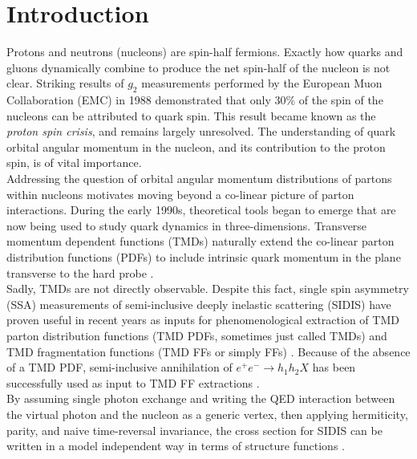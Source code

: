\chapter{Introduction}

Protons and neutrons (nucleons) are spin-half fermions.  Exactly how quarks and gluons dynamically combine to produce the net spin-half of the nucleon is not clear.  Striking results of $g_2$ measurements performed by the European Muon Collaboration (EMC) in 1988 \cite{pdfs-leader:1988} demonstrated that only $30\%$ of the spin of the nucleons can be attributed to quark spin.  This result became known as the \textit{proton spin crisis}, and remains largely unresolved.  The understanding of quark orbital angular momentum in the nucleon, and its contribution to the proton spin, is of vital importance.  \\

Addressing the question of orbital angular momentum distributions of partons within nucleons motivates moving beyond a co-linear picture of parton interactions.   During the early 1990s, theoretical tools began to emerge that are now being used to study quark dynamics in three-dimensions.  Transverse momentum dependent functions (TMDs) naturally extend the co-linear parton distribution functions (PDFs) to include intrinsic quark momentum in the plane transverse to the hard probe \cite{tmds-mulders:1995, tmds-bacchetta:2006}.  \\

Sadly, TMDs are not directly observable.  Despite this fact, single spin asymmetry (SSA) measurements of semi-inclusive deeply inelastic scattering (SIDIS) have proven useful in recent years as inputs for phenomenological extraction of TMD parton distribution functions (TMD PDFs, sometimes just called TMDs) and TMD fragmentation functions (TMD FFs or simply FFs) \cite{tmds-airapetian:2009, tmds-airapetian:2012, tmds-aghasyan:2017}.  Because of the absence of a TMD PDF, semi-inclusive annihilation of $e^+ e^- \rightarrow h_1 h_2 X$ has been successfully used as input to TMD FF extractions \cite{tmds-anselmino:2015}.  \\

By assuming single photon exchange and writing the QED interaction between the virtual photon and the nucleon as a generic vertex, then applying hermiticity, parity, and naive time-reversal invariance, the cross section for SIDIS can be written in a model independent way in terms of structure functions \cite{tmds-mulders:1995, tmds-bacchetta:2006}.  

